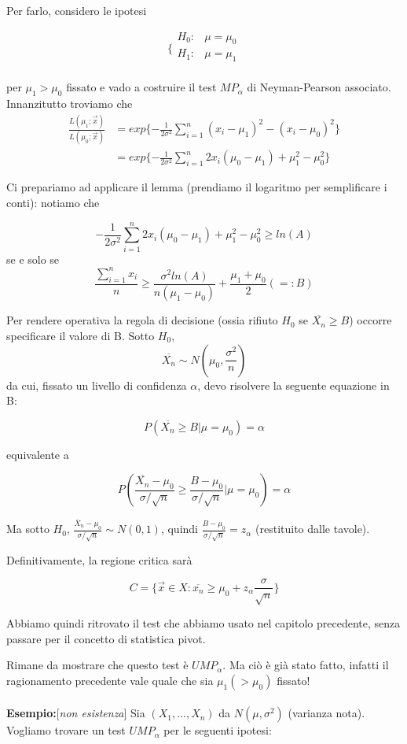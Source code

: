 Per farlo, considero le ipotesi

$$\bigg \{
\begin{array}{rl}
H_0: & \mu = \mu_0 \\
H_1: & \mu = \mu_1 \\
\end{array}
$$

per $\mu_1 > \mu_0$ fissato e vado a costruire il test $MP_\alpha$ di Neyman-Pearson associato.
Innanzitutto troviamo che
\begin{align*}
\frac{L(\mu_1;\vec{x})}{L(\mu_0;\vec{x})} 
&= exp\{ -\frac{1}{2\sigma^2} \sum_{i=1}^n (x_i - \mu_1)^2 - (x_i - \mu_0)^2 \}
\\&= exp\{ -\frac{1}{2\sigma^2} \sum_{i=1}^n 2x_i(\mu_0 - \mu_1) +\mu_1^2 - \mu_0^2 \}
\end{align*}

Ci prepariamo ad applicare il lemma (prendiamo il logaritmo per semplificare i conti): notiamo che

$$ -\frac{1}{2\sigma^2} \sum_{i=1}^n 2x_i(\mu_0 - \mu_1) +\mu_1^2 - \mu_0^2 \geq ln(A)$$
se e solo se
$$\frac{\sum_{i=1}^n x_i}{n} \geq \frac{\sigma^2 ln(A)}{n(\mu_1 - \mu_0)} + \frac{\mu_1 + \mu_0}{2} (=:B)$$

Per rendere operativa la regola di decisione (ossia rifiuto $H_0$ se $\overline{X_n} \geq B$)
occorre specificare il valore di B. 
Sotto $H_0$, $$\overline{X_n} \sim N(\mu_0, \frac{\sigma^2}{n})$$
da cui, fissato un livello di confidenza $\alpha$, devo risolvere la seguente equazione in B:

$$P(\overline{X_n} \geq B | \mu=\mu_0) = \alpha$$

equivalente a

$$P(\frac{\overline{X_n} - \mu_0} {\sigma/\sqrt{n}} \geq \frac{B - \mu_0} {\sigma/\sqrt{n}} | \mu=\mu_0) = \alpha$$

Ma sotto $H_0$, $\frac{\overline{X}_n - \mu_0} {\sigma/\sqrt{n}} \sim N(0,1)$, quindi  $\frac{B - \mu_0} {\sigma/\sqrt{n}} = z_\alpha$ (restituito dalle tavole).

Definitivamente, la regione critica sarà

$$C=\{ \vec{x} \in X : \overline{x_n} \geq \mu_0 + z_\alpha \frac{\sigma}{\sqrt{n}} \}$$ 

Abbiamo quindi ritrovato il test che abbiamo usato nel capitolo precedente, senza passare per il concetto di statistica pivot.

Rimane da mostrare che questo test è $UMP_\alpha$. Ma ciò è già stato fatto, infatti il ragionamento precedente vale quale che sia $\mu_1 (> \mu_0)$ fissato!\\
\\
\textbf{Esempio:}[\textit{non esistenza}] Sia $(X_1,...,X_n)$ da $N(\mu,\sigma^2)$ (varianza nota).
Vogliamo trovare un test $UMP_\alpha$ per le seguenti ipotesi:

